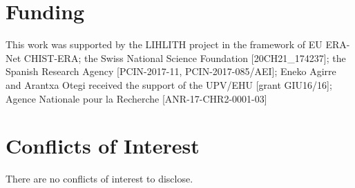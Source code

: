 \section*{Funding}
This work was supported by the LIHLITH project in the framework of EU ERA-Net CHIST-ERA; the Swiss National Science Foundation [20CH21\_174237]; the Spanish Research Agency [PCIN-2017-11, PCIN-2017-085/AEI]; Eneko Agirre and Arantxa Otegi received the support of the UPV/EHU [grant GIU16/16]; Agence Nationale pour la Recherche [ANR-17-CHR2-0001-03]
\section*{Conflicts of Interest}
There are no conflicts of interest to disclose.
  
 
